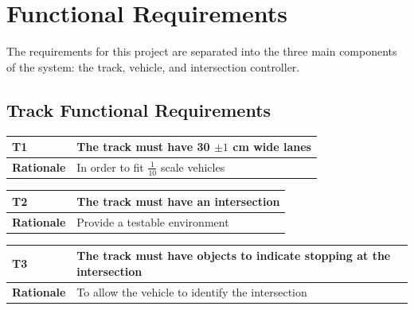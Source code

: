 \documentclass [11pt]{article}
\begin{document}

\section {Functional Requirements} 
The requirements for this project are separated into the three main components of the system: the track, vehicle, and intersection controller.






\subsection{Track Functional Requirements}

\begin{longtable}{| p{ } | p{ } | }\hline 
\rowcolor{tableCell}\textbf{T1} & The track must have 30 $\pm 1$ cm wide lanes \\ \hline
\textbf{Rationale} & In order to fit $\frac{1}{10}$ scale vehicles \\ \hline 

\end{longtable}

\begin{longtable}{| p{ } | p{ } | }\hline 
\rowcolor{tableCell}\textbf{T2} & The track must have an intersection \\ \hline
\textbf{Rationale} &  Provide a testable environment\\ \hline 

\end{longtable}

\begin{longtable}{| p{ } | p{ } | }\hline 
\rowcolor{tableCell}\textbf{T3} &  The track must have objects to indicate stopping at the intersection\\ \hline
\textbf{Rationale} & To allow the vehicle to identify the intersection \\ \hline 
\end{longtable}
\end{document}
